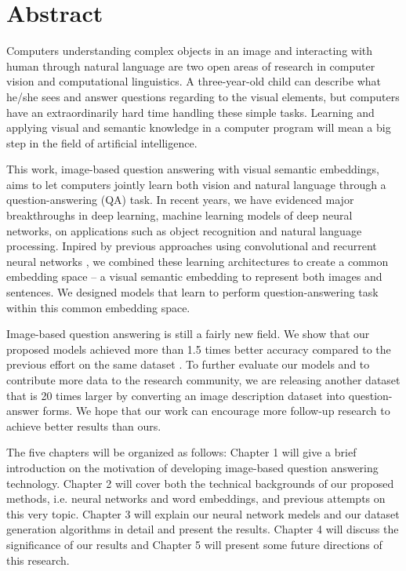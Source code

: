 \chapter*{Abstract}
Computers understanding complex objects in an image and interacting with human through natural language are two open areas of research in computer vision and computational linguistics. A three-year-old child can describe what he/she sees and answer questions regarding to the visual elements, but computers have an extraordinarily hard time handling these simple tasks. Learning and applying visual and semantic knowledge in a computer program will mean a big step in the field of artificial intelligence.

This work, image-based question answering with visual semantic embeddings, aims to let computers jointly learn both vision and natural language through a question-answering (QA) task. In recent years, we have evidenced major breakthroughs in deep learning, machine learning models of deep neural networks, on applications such as object recognition and natural language processing. Inpired by previous approaches using convolutional and recurrent neural networks \cite{simonyan14, krizhevsky12, sutskever14, kiros14b}, we combined these learning architectures to create a common embedding space -- a visual semantic embedding to represent both images and sentences. We designed models that learn to perform question-answering task within this common embedding space.

Image-based question answering is still a fairly new field. We show that our proposed models achieved more than 1.5 times better accuracy compared to the previous effort \cite{malinowski14b} on the same dataset \cite{malinowski14b}. To further evaluate our models and to contribute more data to the research community, we are releasing another dataset that is 20 times larger by converting an image description dataset \cite{mscoco} into question-answer forms. We hope that our work can encourage more follow-up research to achieve better results than ours.

The five chapters will be organized as follows: Chapter 1 will give a brief introduction on the motivation of developing image-based question answering technology. Chapter 2 will cover both the technical backgrounds of our proposed methods, i.e. neural networks and word embeddings, and previous attempts on this very topic. Chapter 3 will explain our neural network medels and our dataset generation algorithms in detail and present the results. Chapter 4 will discuss the significance of our results and Chapter 5 will present some future directions of this research. 